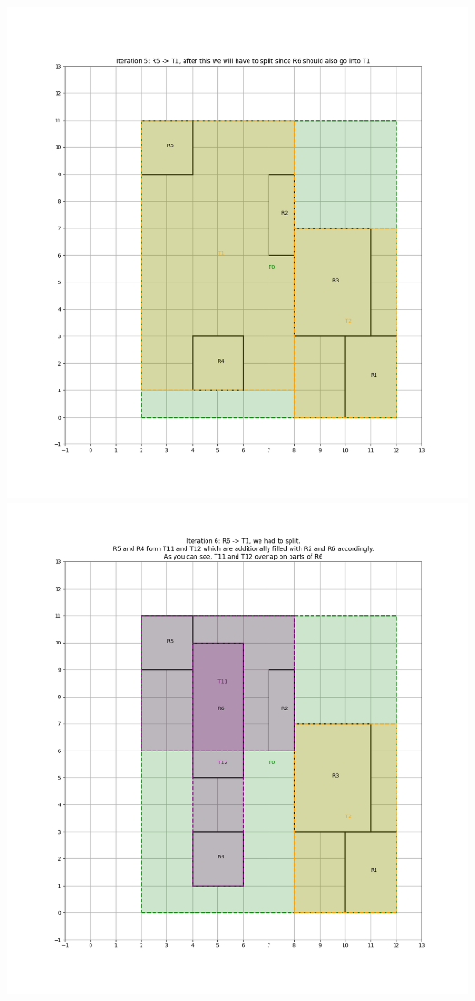 \begin{center}
        \includegraphics[scale=0.5]{./A1 figs/iter5.png}
        \includegraphics[scale=0.5]{./A1 figs/iter6.png}

\end{center}
